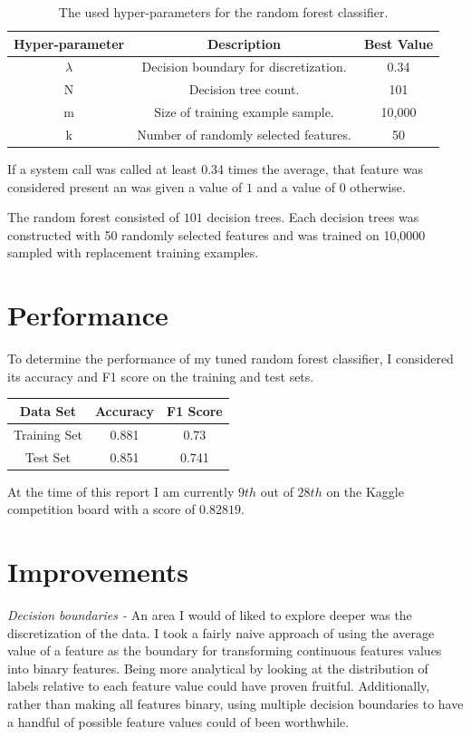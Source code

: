 \documentclass[a4paper, 11pt]{article} %
\begin{document}
\begin{table}[H]
{\renewcommand{\arraystretch}{1.2}%
\begin{tabular}{| c | c | c |}
\hline
Hyper-parameter & Description & Best Value\\
\hline
$\lambda$ & Decision boundary for discretization. & 0.34\\ \hline
N & Decision tree count. & 101\\ \hline
m & Size of training example sample. & 10,000\\ \hline
k & Number of randomly selected features. & 50\\ \hline
\end{tabular}}
\caption{The used hyper-parameters for the random forest classifier.}
\end{table}

If a system call was called at least 0.34 times the average, that feature was considered present an was given a value of $1$ and a value of $0$ otherwise. 

The random forest consisted of $101$ decision trees. Each decision trees was constructed with 50 randomly selected features and was trained on 10,0000 sampled with replacement training examples.

\section*{Performance}
To determine the performance of my tuned random forest classifier, I considered its accuracy and F1 score on the training and test sets.

\begin{table}[H]
{\renewcommand{\arraystretch}{1.2}%
\begin{tabular}{| c | c | c |}
\hline
Data Set & Accuracy & F1 Score\\
\hline
Training Set & 0.881 & 0.73\\ \hline
Test Set & 0.851 & 0.741\\ \hline
\end{tabular}}
\end{table}

At the time of this report I am currently $9th$ out of $28th$ on the Kaggle competition board with a score of $0.82819$.

\section*{Improvements}

\textit{Decision boundaries - }An area I would of liked to explore deeper was the discretization of the data. I took a fairly naive approach of using the average value of a feature as the boundary for transforming continuous features values into binary features. Being more analytical by looking at the distribution of labels relative to each feature value could have proven fruitful. Additionally, rather than making all features binary, using multiple decision boundaries to have a handful of possible feature values could of been worthwhile.
\end{document}

